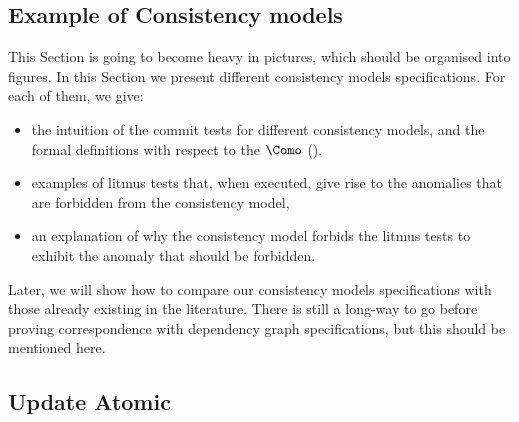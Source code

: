 \subsection{Example of Consistency models}
\label{sec:example-commit-test}
\ac{This Section is going to become heavy in pictures, which should be organised into figures.}
In this Section we present different consistency models specifications. 
For each of them, we give: 
\begin{itemize}
\item the intuition of the commit tests for different consistency models, and the formal definitions with respect to the \(\Como\) ().
\item examples of litmus tests that, when executed, give rise to the anomalies that are forbidden from the consistency model, 
\item an explanation of why the consistency model forbids the litmus tests to exhibit the anomaly that should be forbidden. 
\end{itemize}
Later, we will show how to compare our consistency models specifications with those already existing in the 
literature.
\ac{There is still a long-way to go before proving correspondence with dependency graph specifications, 
but this should be mentioned here.}








\subsection{Update Atomic}




